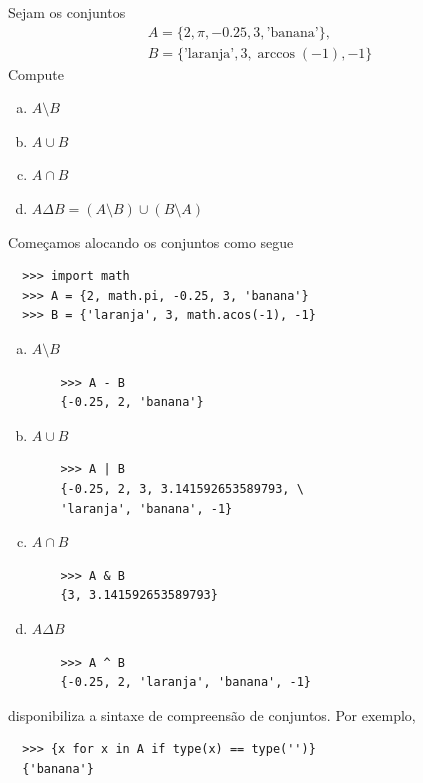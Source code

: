 \documentclass[12pt]{article}
\begin{document}
\begin{ex}
  Sejam os conjuntos
  \begin{gather}
    A = \{2, \pi, -0.25, 3, \text{'banana'}\},\\
    B = \{\text{'laranja'}, 3, \operatorname{arc cos}(-1), -1\}
  \end{gather}
  Compute
  \begin{enumerate}[a)]
  \item $A\setminus B$
  \item $A\cup B$
  \item $A\cap B$
  \item $A\Delta B = (A\setminus B) \cup (B\setminus A)$
  \end{enumerate}

   Começamos alocando os conjuntos como segue
  \begin{lstlisting}
  >>> import math
  >>> A = {2, math.pi, -0.25, 3, 'banana'}
  >>> B = {'laranja', 3, math.acos(-1), -1}
  \end{lstlisting}
  
  \begin{enumerate}[a)]
  \item $A\setminus B$
    \begin{lstlisting}
    >>> A - B
    {-0.25, 2, 'banana'}
    \end{lstlisting}
  \item $A\cup B$
    \begin{lstlisting}
    >>> A | B
    {-0.25, 2, 3, 3.141592653589793, \
    'laranja', 'banana', -1}
    \end{lstlisting}
  \item $A\cap B$
    \begin{lstlisting}
    >>> A & B
    {3, 3.141592653589793}
    \end{lstlisting}
  \item $A\Delta B$
    \begin{lstlisting}
    >>> A ^ B
    {-0.25, 2, 'laranja', 'banana', -1}
    \end{lstlisting}
  \end{enumerate}
\end{ex}

\begin{obs}
  {\python} disponibiliza a sintaxe de compreensão de conjuntos. Por exemplo,
  \begin{lstlisting}
  >>> {x for x in A if type(x) == type('')}
  {'banana'}
  \end{lstlisting}
\end{obs}
\end{document}
